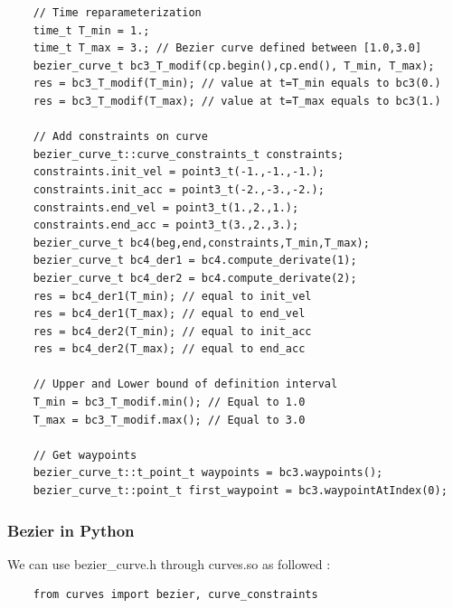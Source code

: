 \documentclass{article}
\begin{document}
\begin{lstlisting}
    // Time reparameterization
    time_t T_min = 1.;
    time_t T_max = 3.; // Bezier curve defined between [1.0,3.0]
    bezier_curve_t bc3_T_modif(cp.begin(),cp.end(), T_min, T_max);
    res = bc3_T_modif(T_min); // value at t=T_min equals to bc3(0.)
    res = bc3_T_modif(T_max); // value at t=T_max equals to bc3(1.)
    
    // Add constraints on curve
    bezier_curve_t::curve_constraints_t constraints;
    constraints.init_vel = point3_t(-1.,-1.,-1.);
    constraints.init_acc = point3_t(-2.,-3.,-2.);
    constraints.end_vel = point3_t(1.,2.,1.);
    constraints.end_acc = point3_t(3.,2.,3.);
    bezier_curve_t bc4(beg,end,constraints,T_min,T_max);
    bezier_curve_t bc4_der1 = bc4.compute_derivate(1);
    bezier_curve_t bc4_der2 = bc4.compute_derivate(2);  
    res = bc4_der1(T_min); // equal to init_vel
    res = bc4_der1(T_max); // equal to end_vel
    res = bc4_der2(T_min); // equal to init_acc
    res = bc4_der2(T_max); // equal to end_acc
    
    // Upper and Lower bound of definition interval
    T_min = bc3_T_modif.min(); // Equal to 1.0
    T_max = bc3_T_modif.max(); // Equal to 3.0
    
    // Get waypoints
    bezier_curve_t::t_point_t waypoints = bc3.waypoints();
    bezier_curve_t::point_t first_waypoint = bc3.waypointAtIndex(0);
    \end{lstlisting}

    \subsubsection{Bezier in Python}
    
    We can use bezier\_curve.h through curves.so as followed :

    \begin{lstlisting}
    from curves import bezier, curve_constraints
    \end{lstlisting}
        
\end{document}
